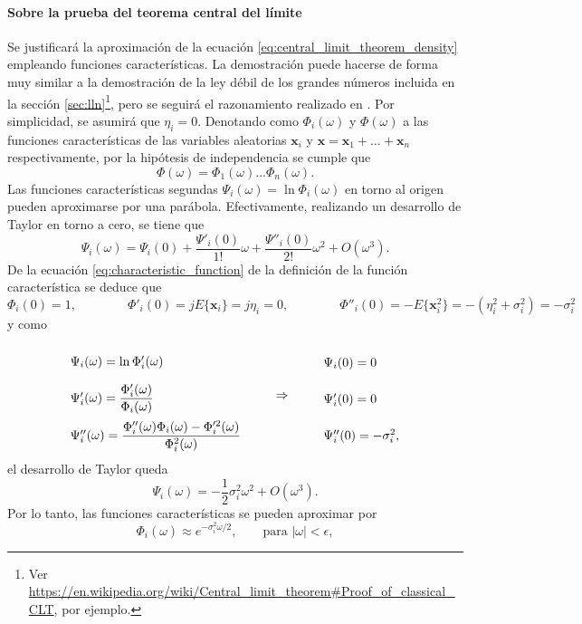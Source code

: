 \documentclass[a4paper]{report}
\newcommand{\x}{\mathbf{x}}
\begin{document}
\paragraph{Sobre la prueba del teorema central del límite} Se justificará la aproximación de la ecuación \ref{eq:central_limit_theorem_density} empleando funciones características. La demostración puede hacerse de forma muy similar a la demostración de la ley débil de los grandes números incluida en la sección \ref{sec:lln}\footnote{Ver \url{https://en.wikipedia.org/wiki/Central_limit_theorem\#Proof_of_classical_CLT}, por ejemplo.}, pero se seguirá el razonamiento realizado en \cite{papoulis2002probability}. Por simplicidad, se asumirá que \(\eta_i=0\). Denotando como \(\Phi_i(\omega)\) y \(\Phi(\omega)\) a las funciones características de las variables aleatorias \(\x_i\) y \(\x=\x_1+\dots+\x_n\) respectivamente, por la hipótesis de independencia se cumple que 
\[
 \Phi(\omega)=\Phi_1(\omega)\dots\Phi_n(\omega).
\]
Las funciones características segundas \(\Psi_i(\omega)=\ln\Phi_i(\omega)\) en torno al origen pueden aproximarse por una parábola. Efectivamente, realizando un desarrollo de Taylor en torno a cero, se tiene que
\[
 \Psi_i(\omega)=\Psi_i(0)+\frac{\Psi'_i(0)}{1!}\omega+\frac{\Psi''_i(0)}{2!}\omega^2+O(\omega^3).
\]
De la ecuación \ref{eq:characteristic_function} de la definición de la función característica se deduce que
\[
 \Phi_i(0)=1,\qquad\qquad\Phi'_i(0)=jE\{\x_i\}=j\eta_i=0,\qquad\qquad\Phi''_i(0)=-E\{\x_i^2\}=-(\eta_i^2+\sigma_i^2)=-\sigma_i^2
\]
y como
\[
\def\arraystretch{2.4}
 \begin{array}{l}
  \Psi_i(\omega)=\ln\Phi'_i(\omega)\\
  \Psi'_i(\omega)=\dfrac{\Phi'_i(\omega)}{\Phi_i(\omega)}\\
  \Psi''_i(\omega)=\dfrac{\Phi''_i(\omega)\Phi_i(\omega)-\Phi'^2_i(\omega)}{\Phi^2_i(\omega)}
 \end{array}
 \qquad\Rightarrow\qquad
 \begin{array}{l}
  \Psi_i(0)=0\\
  \Psi'_i(0)=0\\
  \Psi''_i(0)=-\sigma_i^2,
 \end{array}
\]
el desarrollo de Taylor queda
\begin{equation}\label{eq:central_limit_theorem_characteristic_taylor}
 \Psi_i(\omega)=-\frac{1}{2}\sigma_i^2\omega^2+O(\omega^3).
\end{equation}
Por lo tanto, las funciones características se pueden aproximar por 
\[
 \Phi_i(\omega)\approx e^{-\sigma_i^2\omega/2},\qquad\textrm{para }|\omega|<\epsilon,
\]
\end{document}
